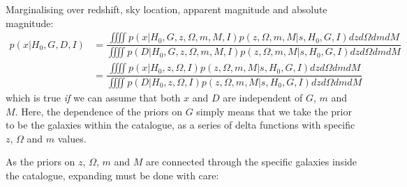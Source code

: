 \documentclass[a4paper,10pt]{article}
\begin{document}
%
%



Marginalising over redshift, sky location, apparent magnitude and absolute magnitude:
\begin{equation}
\begin{aligned}
p(x|H_0,G,D,I) &= \dfrac{\iiiint p(x|H_0,G,z,\Omega,m,M,I) p(z,\Omega,m,M|s,H_0,G,I) dz d\Omega dm dM}{\iiiint p(D|H_0,G,z,\Omega,m,M,I) p(z,\Omega,m,M|s,H_0,G,I) dz d\Omega dm dM}
\\ &= \dfrac{\iiiint p(x|H_0,z,\Omega,I) p(z,\Omega,m,M|s,H_0,G,I) dz d\Omega dm dM}{\iiiint p(D|H_0,z,\Omega,I) p(z,\Omega,m,M|s,H_0,G,I) dz d\Omega dm dM}
\end{aligned}
\end{equation}
which is true \emph{if} we can assume that both $x$ and $D$ are independent of $G$, $m$ and $M$.  Here, the dependence of the priors on $G$ simply means that we take the prior to be the galaxies within the catalogue, as a series of delta functions with specific $z$, $\Omega$ and $m$ values.

As the priors on $z$, $\Omega$, $m$ and $M$ are connected through the specific galaxies inside the catalogue, expanding must be done with care:
\end{document}

